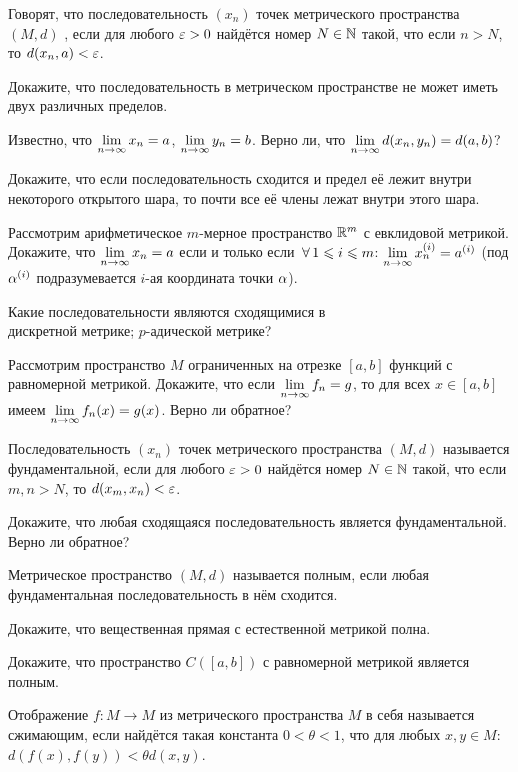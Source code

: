 \documentclass[a4paper,12pt]{article}
\begin{document}

Говорят, что последовательность $(x_n)$ точек метрического пространства $(M, d)$ , если для любого $\varepsilon>0$ найдётся номер $N\in\mathbb{N}$ такой, что если $n>N$, то $d(x_n, a)<\varepsilon$.

Докажите, что последовательность в метрическом пространстве не может иметь двух различных пределов.

Известно, что $\lim\limits_{n \rightarrow \infty} x_n = a$, $\lim\limits_{n \rightarrow \infty} y_n = b$. Верно ли, что $\lim\limits_{n \rightarrow \infty} d(x_n, y_n) = d(a,b)$?

Докажите, что если последовательность сходится и предел её лежит внутри некоторого открытого шара, то почти все её члены лежат внутри этого шара.

Рассмотрим арифметическое $m$-мерное пространство $\mathbb{R}^m$ с евклидовой метрикой. Докажите, что $\lim\limits_{n \rightarrow \infty} x_n = a$ если и только если $\,\forall\, 1\leqslant i\leqslant m$: $\lim\limits_{n \rightarrow \infty} x_n^{(i)} = a^{(i)}$ (под $\alpha^{(i)}$ подразумевается $i$-ая координата точки $\alpha$).

Какие последовательности являются сходящимися в\\
дискретной метрике;
$p$-адической метрике?

Рассмотрим пространство $M$ ограниченных на отрезке $[a, b]$
функций с равномерной метрикой.
Докажите, что если $\lim\limits_{n \rightarrow \infty} f_n = g$, то для всех $x \in [a, b]$ имеем $\lim\limits_{n \rightarrow \infty} f_n(x) = g(x)$.
Верно ли обратное?

Последовательность $(x_n)$ точек метрического пространства $(M,d)$ называется  фундаментальной, если для любого $\varepsilon>0$ найдётся номер $N\in\mathbb{N}$ такой, что если $m,n>N$, то $d(x_m, x_n)<\varepsilon$.

Докажите, что любая сходящаяся последовательность является фундаментальной.\\
Верно ли обратное?

Метрическое пространство $(M, d)$ называется  полным, если любая фундаментальная последовательность в нём сходится.

Докажите, что вещественная прямая с естественной метрикой полна.

Докажите, что пространство $C([a,b])$ с равномерной метрикой является полным.

Отображение $f\colon M \to M$ из метрического пространства $M$
в себя называется  сжимающим, если найдётся такая константа
$0<\theta<1$, что для любых $x,y\in M$: $d(f(x),f(y))<\theta
d(x,y)$.
\end{document}
